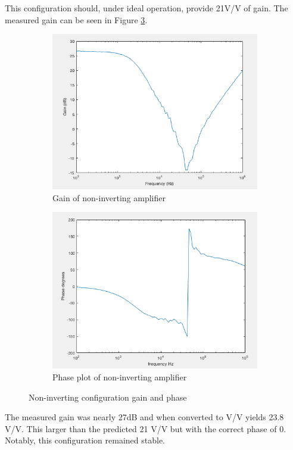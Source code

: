 This configuration should, under ideal operation, provide 21V/V  of gain. The measured gain can be seen in Figure \ref{fig:gainnoninverting}.
		
		
		
						\begin{figure}[H]
			\centering
			\begin{subfigure}[b]{0.45\textwidth}
				\centering
				\includegraphics[scale=.40]{ExperimentalImplementation/gainnoninverting.png}
\caption{Gain of non-inverting amplifier}
\label{fig:gainnoninverting1}
			\end{subfigure}
			\hfill
			\begin{subfigure}[b]{0.45\textwidth}
				\centering
			\includegraphics[scale=.40]{ExperimentalImplementation/phasenoninverting.png}
\caption{Phase plot of non-inverting amplifier}
\label{fig:phasenoninverting}
			\end{subfigure}
			\caption{Non-inverting configuration gain and phase}
			\label{fig:gainnoninverting}
		\end{figure} 
		
The measured gain was nearly 27dB and when converted to V/V yields 23.8 V/V.  This larger than the predicted 21 V/V but with the correct phase of 0. Notably, this configuration remained stable.



	
	